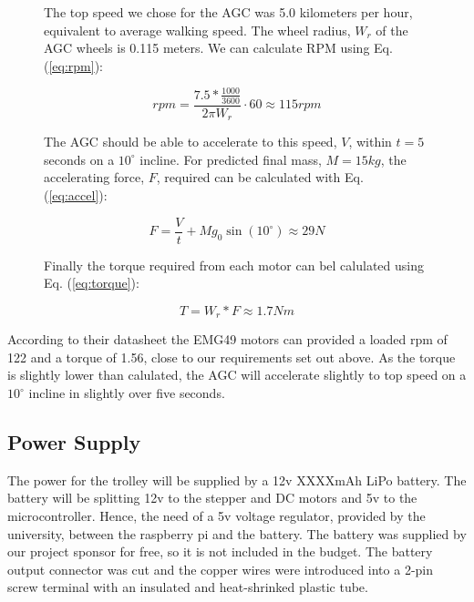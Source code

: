 \documentclass[11pt,landscape]{article}
\begin{document}
\begin{multicols}{3}
\begin{figure}[H]
    \begin{mdframed}
        The top speed we chose for the AGC was 5.0 kilometers per hour,
        equivalent to average walking speed. 
        The wheel radius, $W_r$ of the AGC wheels is 0.115 meters. We can
        calculate RPM using Eq. (\ref{eq:rpm}):
        \begin{center}
            \begin{equation}
                rpm = \frac{7.5 * \frac{1000}{3600}}{2\pi W_r} \cdot 60 \approx 115rpm
                \label{eq:rpm}
            \end{equation}
        \end{center}
        The AGC should be able
        to accelerate to this speed, $V$, within $t=5$ seconds on a $10^\circ$ incline.
        For predicted final mass, $M = 15kg$, 
        the accelerating force, $F$, required can be calculated with Eq. (\ref{eq:accel}):
        \begin{center}
            \begin{equation}
                F = \frac{V}{t} + M g_0 \sin(10^\circ)\approx 29 N
                \label{eq:accel}
            \end{equation}
        \end{center}
        Finally the torque required from each motor can bel calulated using Eq.
        (\ref{eq:torque}):
        \begin{center}
            \begin{equation}
                T = W_r * F \approx 1.7 Nm
                \label{eq:torque} 
            \end{equation}
        \end{center}
    \end{mdframed}
    \label{fig:motor_calcs}
\end{figure}

According to their datasheet the EMG49 motors can provided a loaded rpm of 122
and a torque of 1.56, close to our requirements set out above. As the torque is
slightly lower than calulated, the AGC will accelerate slightly to top speed on
a $10^\circ$ incline in slightly over five seconds.

\subsection{Power Supply}
The power for the trolley will be supplied by a 12v XXXXmAh LiPo battery. The
battery will be splitting 12v to the stepper and DC motors and 5v to the
microcontroller. Hence, the need of a 5v voltage regulator, provided by the
university, between the raspberry pi and the battery. The battery was supplied
by our project sponsor for free, so it is not included in the budget. The
battery output connector was cut and the copper wires were introduced into a
2-pin screw terminal with an insulated and heat-shrinked plastic tube.



\end{multicols}
\end{document}
